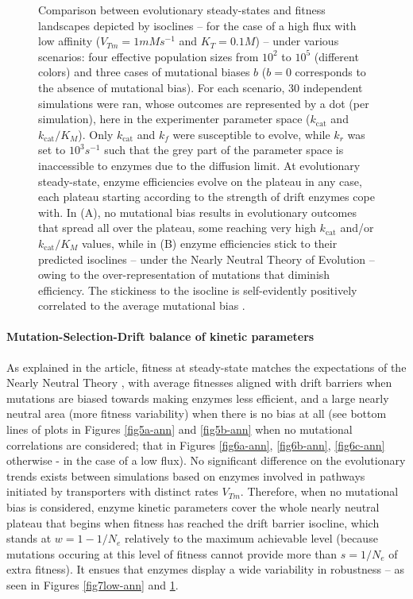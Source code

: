 \begin{figure}[h!]
\begin{minipage}[c]{0.48\linewidth}
\end{minipage}
\caption{Comparison between evolutionary steady-states and fitness landscapes depicted by isoclines -- for the case of a high flux with low affinity ($V_{Tm}=1mMs^{-1}$ and $K_T=0.1M$) -- under various scenarios: four effective population sizes from $10^2$ to $10^5$ (different colors) and three cases of mutational biases %
$b$ ($b=0$ corresponds to the absence of mutational bias). For each scenario, 30 independent simulations were ran, whose outcomes are represented by a dot (per simulation), here in the experimenter parameter space ($k_\text{cat}$ and $k_\text{cat}/K_M$). Only $k_\text{cat}$ and $k_f$ were susceptible to evolve, while $k_r$ was set to $10^3s^{-1}$ such that the grey part of the parameter space is inaccessible to enzymes due to the diffusion limit. At evolutionary steady-state, enzyme efficiencies evolve on the plateau in any case, each plateau starting according to the strength of drift enzymes cope with. In (A), no mutational bias results in evolutionary outcomes that spread all over the plateau, some reaching very high $k_\text{cat}$ and/or $k_\text{cat}/K_M$ values, while in (B) enzyme efficiencies stick to their predicted isoclines -- under the Nearly Neutral Theory of Evolution \citep{Ohta92} -- owing to the over-representation of mutations that diminish efficiency. The stickiness to the isocline is self-evidently positively correlated to the average mutational bias%
.}
\label{fig7high-ann}
\end{figure}


\noindent\paragraph{Mutation-Selection-Drift balance of kinetic parameters}

As explained in the article, fitness at steady-state matches the expectations of the Nearly Neutral Theory \citep{Kimura68,Ohta73,Ohta92}, with average fitnesses aligned with drift barriers \citep{Sung12} when mutations are biased towards making enzymes less efficient, and a large nearly neutral area (more fitness variability) when there is no bias at all (see bottom lines of plots in Figures \ref{fig5a-ann} and \ref{fig5b-ann} when no mutational correlations are considered; that in Figures \ref{fig6a-ann}, \ref{fig6b-ann}, \ref{fig6c-ann} otherwise - in the case of a low flux). No significant difference on the evolutionary trends exists between simulations based on enzymes involved in pathways initiated by transporters with distinct rates $V_{Tm}$. Therefore, when no mutational bias is considered, enzyme kinetic parameters cover the whole nearly neutral plateau that begins when fitness has reached the drift barrier isocline, which stands at $w=1-1/N_e$ relatively to the maximum achievable level (because mutations occuring at this level of fitness cannot provide more than $s=1/N_e$ of extra fitness). It ensues that enzymes display a wide variability in robustness -- as seen in Figures \ref{fig7low-ann} and \ref{fig7high-ann}.


